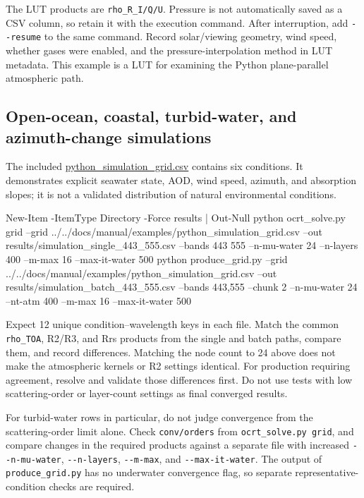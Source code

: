 The LUT products are \texttt{rho\_\allowbreak{}R\_\allowbreak{}I/\allowbreak{}Q/\allowbreak{}U}. Pressure is not automatically saved as a CSV column, so retain it with the execution command. After interruption, add \texttt{-\allowbreak{}-\allowbreak{}resume} to the same command. Record solar/viewing geometry, wind speed, whether gases were enabled, and the pressure-interpolation method in LUT metadata. This example is a LUT for examining the Python plane-parallel atmospheric path.

\subsection{Open-ocean, coastal, turbid-water, and azimuth-change simulations}
\label{sec:auto:06_python_batch:7.3}
The included \href{https://github.com/brtnt/OCRT/blob/main/docs/manual/examples/python_simulation_grid.csv}{python\_simulation\_grid.csv} contains six conditions. It demonstrates explicit seawater state, AOD, wind speed, azimuth, and absorption slopes; it is not a validated distribution of natural environmental conditions.


\begin{ManualCode}
New-Item -ItemType Directory -Force results | Out-Null
python ocrt_solve.py grid --grid ../../docs/manual/examples/python_simulation_grid.csv --out results/simulation_single_443_555.csv --bands 443 555 --n-mu-water 24 --n-layers 400 --m-max 16 --max-it-water 500
python produce_grid.py --grid ../../docs/manual/examples/python_simulation_grid.csv --out results/simulation_batch_443_555.csv --bands 443,555 --chunk 2 --n-mu-water 24 --nt-atm 400 --m-max 16 --max-it-water 500
\end{ManualCode}

Expect 12 unique condition--wavelength keys in each file. Match the common \texttt{rho\_\allowbreak{}TOA}, R2/R3, and Rrs products from the single and batch paths, compare them, and record differences. Matching the node count to 24 above does not make the atmospheric kernels or R2 settings identical. For production requiring agreement, resolve and validate those differences first. Do not use tests with low scattering-order or layer-count settings as final converged results.

For turbid-water rows in particular, do not judge convergence from the scattering-order limit alone. Check \texttt{conv/\allowbreak{}orders} from \texttt{ocrt\_\allowbreak{}solve.\allowbreak{}py grid}, and compare changes in the required products against a separate file with increased \texttt{-\allowbreak{}-\allowbreak{}n-\allowbreak{}mu-\allowbreak{}water}, \texttt{-\allowbreak{}-\allowbreak{}n-\allowbreak{}layers}, \texttt{-\allowbreak{}-\allowbreak{}m-\allowbreak{}max}, and \texttt{-\allowbreak{}-\allowbreak{}max-\allowbreak{}it-\allowbreak{}water}. The output of \texttt{produce\_\allowbreak{}grid.\allowbreak{}py} has no underwater convergence flag, so separate representative-condition checks are required.

